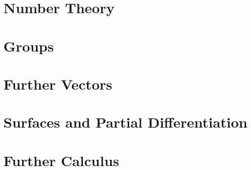 \documentclass[a4paper]{report}
\begin{document}
\chapter{Number Theory}

\chapter{Groups}

\chapter{Further Vectors}

\chapter{Surfaces and Partial Differentiation}

\chapter{Further Calculus}
\end{document}
